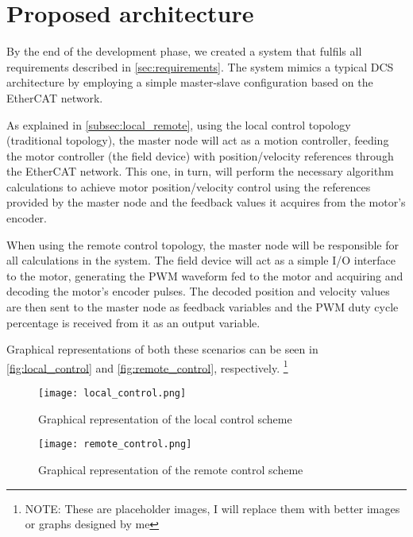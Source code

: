 \section{Proposed architecture} \label{sec:proposed-arch}

By the end of the development phase, we created a system that fulfils all requirements described in \autoref{sec:requirements}.
The system mimics a typical DCS architecture by employing a simple master-slave configuration based on the EtherCAT network.

As explained in \autoref{subsec:local_remote}, using the local control topology (traditional topology), the master node will act as a motion controller, feeding the motor controller (the field device) with position/velocity references through the EtherCAT network.
This one, in turn, will perform the necessary algorithm calculations to achieve motor position/velocity control using the references provided by the master node and the feedback values it acquires from the motor's encoder.

When using the remote control topology, the master node will be responsible for all calculations in the system.
The field device will act as a simple I/O interface to the motor, generating the PWM waveform fed to the motor and acquiring and decoding the motor's encoder pulses.
The decoded position and velocity values are then sent to the master node as feedback variables and the PWM duty cycle percentage is received from it as an output variable.

Graphical representations of both these scenarios can be seen in \autoref{fig:local_control} and \autoref{fig:remote_control}, respectively. \footnote{NOTE: These are placeholder images, I will replace them with better images or graphs designed by me}


\begin{figure}[t]
	\centering
	\texttt{[image: local\_control.png]}
	\caption{Graphical representation of the local control scheme}
	\label{fig:local_control}
\end{figure}

\begin{figure}[t]
	\centering
	\texttt{[image: remote\_control.png]}
	\caption{Graphical representation of the remote control scheme}
	\label{fig:remote_control}
\end{figure}





